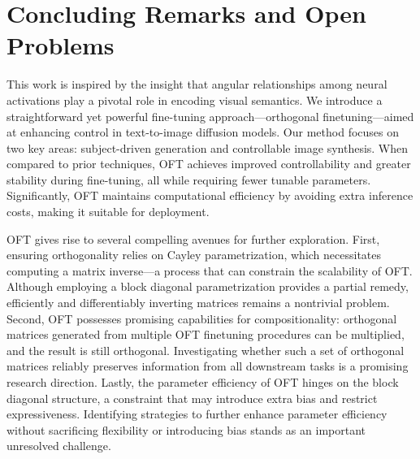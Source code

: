\section{Concluding Remarks and Open Problems}

This work is inspired by the insight that angular relationships among neural activations play a pivotal role in encoding visual semantics. We introduce a straightforward yet powerful fine-tuning approach—orthogonal finetuning—aimed at enhancing control in text-to-image diffusion models. Our method focuses on two key areas: subject-driven generation and controllable image synthesis. When compared to prior techniques, OFT achieves improved controllability and greater stability during fine-tuning, all while requiring fewer tunable parameters. Significantly, OFT maintains computational efficiency by avoiding extra inference costs, making it suitable for deployment.

OFT gives rise to several compelling avenues for further exploration. First, ensuring orthogonality relies on Cayley parametrization, which necessitates computing a matrix inverse—a process that can constrain the scalability of OFT. Although employing a block diagonal parametrization provides a partial remedy, efficiently and differentiably inverting matrices remains a nontrivial problem. Second, OFT possesses promising capabilities for compositionality: orthogonal matrices generated from multiple OFT finetuning procedures can be multiplied, and the result is still orthogonal. Investigating whether such a set of orthogonal matrices reliably preserves information from all downstream tasks is a promising research direction. Lastly, the parameter efficiency of OFT hinges on the block diagonal structure, a constraint that may introduce extra bias and restrict expressiveness. Identifying strategies to further enhance parameter efficiency without sacrificing flexibility or introducing bias stands as an important unresolved challenge.

